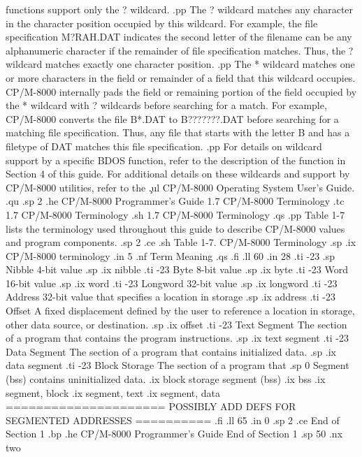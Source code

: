 functions support only the ? wildcard.
.pp
The ? wildcard matches any character in the character
position occupied by this wildcard.  For example, the file
specification M?RAH.DAT indicates the second letter of the
filename can be any alphanumeric character if the remainder of
file specification matches.  Thus, the ? wildcard matches exactly one
character position. 
.pp
The * wildcard matches one or more characters in the
field or remainder of a field that this wildcard occupies.  CP/M-8000
internally pads the field or remaining portion of the field 
occupied by the * wildcard with ?
wildcards before searching for a match.  For example, CP/M-8000
converts the file B*.DAT to B???????.DAT before searching for a matching
file specification.  Thus, any file that starts with the letter B
and has a filetype of DAT matches this file specification. 
.pp
For details on wildcard support by a specific BDOS function, refer to  
the description of the function in Section 4 of this guide.  For
additional details on these wildcards and support by CP/M-8000 utilities,
refer to the \c
.ul
CP/M-8000 Operating System User's Guide. 
.qu
.sp 2
.he CP/M-8000 Programmer's Guide              1.7 CP/M-8000 Terminology
.tc    1.7 CP/M-8000 Terminology 
.sh 
1.7 CP/M-8000 Terminology
.qs
.pp
Table 1-7 lists the terminology used throughout this guide to describe
CP/M-8000 values and program components. 
.sp 2
.ce
.sh
Table 1-7.  CP/M-8000 Terminology
.sp 
.ix CP/M-8000 terminology
.in 5
.nf
 Term                      Meaning 
.qs
.fi
.ll 60
.in 28
.ti -23
.sp 
Nibble                 4-bit value
.sp
.ix nibble
.ti -23    
Byte                   8-bit value
.sp    
.ix byte
.ti -23  
Word                   16-bit value
.sp  
.ix word
.ti -23
Longword               32-bit value
.sp 
.ix longword
.ti -23
Address                32-bit value that specifies a location in storage
.sp 
.ix address
.ti -23
Offset                 A fixed displacement defined by the user to reference 
a location in storage, other data source, or destination.
.sp
.ix offset
.ti -23
Text Segment           The section of a program that contains the program 
instructions.
.sp
.ix text segment
.ti -23
Data Segment           The section of a program that contains initialized data.
.sp
.ix data segment
.ti -23
Block Storage          The section  of a  program  that 
.sp 0
Segment (bss)          contains uninitialized data.
.ix block storage segment (bss)
.ix bss
.ix segment, block
.ix segment, text
.ix segment, data
===================== POSSIBLY ADD DEFS FOR SEGMENTED ADDRESSES ==========
.fi
.ll 65
.in 0
.sp 2
.ce
End of Section 1
.bp
.he CP/M-8000 Programmer's Guide                      End of Section 1
.sp 50
.nx two


